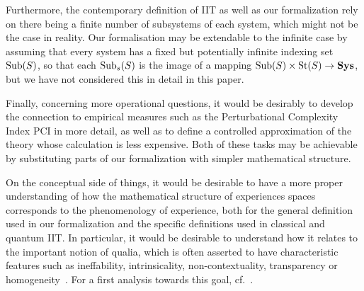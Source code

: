 Furthermore, the contemporary definition of IIT as well as our formalization rely on there being a finite number of subsystems of each system, which might not be the case in reality. Our formalisation may be extendable to the infinite case by assuming that every system has a fixed but potentially infinite indexing set 
$\mathrm{Sub}(S)$, so that each $\mathrm{Sub}_s(S)$ is the image of a mapping $\mathrm{Sub}(S) \times \text{St}(S) \to \mathbf{Sys}$, but we have not considered this in detail in this paper.

Finally, concerning more operational questions, it would be desirably to develop the connection to empirical measures such as the Perturbational Complexity Index PCI \cite{casarotto2016stratification,casali2013theoretically} in more detail, as well as to define a controlled approximation of the theory whose calculation is less expensive. Both of these tasks may be achievable by substituting parts of our formalization with simpler mathematical structure.

On the conceptual side of things, it would be desirable to have a more proper understanding of how the mathematical structure of experiences spaces corresponds to the phenomenology of experience, both for the general definition used in our formalization and the specific definitions used in classical and quantum IIT. In particular, it would be desirable to understand how it relates to the important notion of qualia, which is often asserted to have characteristic features such as ineffability, intrinsicality, non-contextuality, transparency or homogeneity~\cite{metzinger2006grundkurs}. For a first analysis towards this goal, cf.~\cite{kleiner2019models}.



